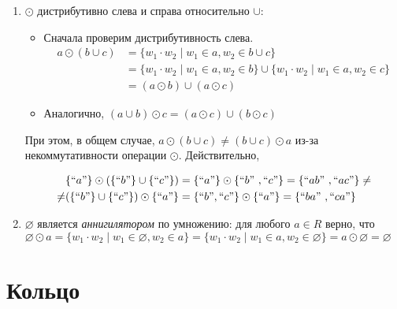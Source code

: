 \begin{example}
\begin{enumerate}
\item $\odot$ дистрибутивно слева и справа относительно $\cup$:
\begin{itemize}
	\item Сначала проверим дистрибутивность слева.
	\begin{align*} 
		a \odot (b \cup c) & = \{ w_1 \cdot w_2 \mid  w_1 \in a, w_2 \in b \cup c\} \\
		                   & = \{ w_1 \cdot w_2 \mid  w_1 \in a, w_2 \in b \} \cup  \{ w_1 \cdot w_2 \mid  w_1 \in a, w_2 \in c \} \\
		                   & =  (a \odot b) \cup (a \odot c)
	\end{align*}

    \item Аналогично, $(a \cup b) \odot c = (a \odot c) \cup (b \odot c)$
\end{itemize}
При этом, в общем случае, $a \odot (b \cup c) \neq (b \cup c) \odot a$ из-за некоммутативности операции $\odot$. Действительно, 

\begin{align*}
	& \{``a"\}\odot(\{``b"\} \cup \{``c"\}) = \{``a"\}\odot \{``b" \ ,``c" \} =  \{``ab"\ ,``ac" \} \neq \\
	\neq & (\{``b"\} \cup \{``c"\}) \odot \{``a"\} =  \{``b",``c" \} \odot \{``a"\} =  \{``ba"\ ,``ca" \}
\end{align*}


\item $\varnothing$ является \textit{аннигилятором} по умножению: для любого $a \in R$ верно, что
$\varnothing \odot a =  \{ w_1 \cdot w_2 \mid w_1 \in \varnothing, w_2 \in a \} =  \{ w_1 \cdot w_2 \mid w_1 \in a, w_2 \in \varnothing \} = a \odot \varnothing = \varnothing$

\end{enumerate}

\end{example}

\section{Кольцо}


